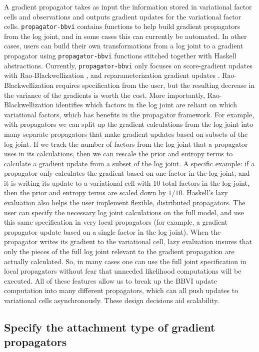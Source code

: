 \documentclass[12pt]{article}
\begin{document}
A gradient propagator takes as input the information stored in
variational factor cells and observations and outputs gradient updates
for the variational factor cells. \texttt{propagator-bbvi} contains
functions to help build gradient propagators from the log joint, and
in some cases this can currently be automated. In other cases, users
can build their own transformations from a log joint to a gradient
propagator using \texttt{propagator-bbvi} functions stitched together
with Haskell abstractions. Currently, \texttt{propagator-bbvi} only
focuses on score-gradient updates with Rao-Blackwellization
\citep{ranganath-2014}, and reparameterization gradient updates
\citep{kuc-2017}. Rao-Blackwellization requires specification from the
user, but the resulting decrease in the variance of the gradients is
worth the cost. More importantly, Rao-Blackwellization identifies
which factors in the log joint are reliant on which variational
factors, which has benefits in the propagator framework. For example,
with propagators we can split up the gradient calculations from the
log joint into many separate propagators that make gradient updates
based on subsets of the log joint. If we track the number of factors
from the log joint that a propagator uses in its calculations, then we
can rescale the prior and entropy terms to calculate a gradient update
from a subset of the log joint. A specific example: if a propagator
only calculates the gradient based on one factor in the log joint, and
it is writing its update to a variational cell with 10 total factors
in the log joint, then the prior and entropy terms are scaled down by
$1/10$. Haskell's lazy evaluation also helps the user implement
flexible, distributed propagators. The user can specify the necessary
log joint calculations on the full model, and use this same
specification in very local propagators (for example, a gradient
propagator update based on a single factor in the log joint). When the
propagator writes its gradient to the variational cell, lazy
evaluation insures that only the pieces of the full log joint relevant
to the gradient propagation are actually calculated. So, in many cases
one can use the full joint specification in local propagators without
fear that unneeded likelihood computations will be executed. All of
these features allow us to break up the BBVI update computation into
many different propagators, which can all push updates to variational
cells asynchronously. These design decisions aid scalability.

\subsection{Specify the attachment type of gradient propagators}
\end{document}
